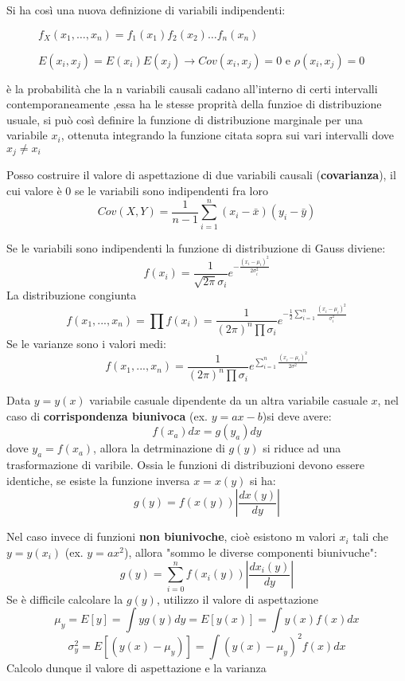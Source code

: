 \documentclass{article}
\begin{document}
Si ha così una nuova definizione di variabili indipendenti:
\begin{description}
    \item[] $f_X(x_1, \ldots, x_n) = f_1(x_1)f_2(x_2)\ldots f_n(x_n)$
    \item[] $E(x_i,x_j)=E(x_i)E(x_j) \rightarrow Cov(x_i,x_j)=0$ e $\rho(x_i,x_j)=0$
\end{description}

è la probabilità che la n variabili causali cadano all'interno  di certi intervalli contemporaneamente
,essa ha le stesse proprità della funzioe di distribuzione usuale, si può così definire la funzione di distribuzione marginale per una variabile $x_i$, ottenuta integrando
la funzione citata sopra sui vari intervalli dove $x_j\neq x_i$

Posso costruire il valore di aspettazione di due variabili causali (\textbf{covarianza}), il cui valore è 0 se le variabili sono indipendenti fra loro
\[
Cov (X, Y) = \frac{1}{n - 1} \sum_{i=1}^{n} (x_i - \bar{x})(y_i - \bar{y})
\]



Se le variabili sono indipendenti la funzione di distribuzione di Gauss diviene:
\[
f(x_i)=\frac{1}{\sqrt{2\pi}\sigma_i}e^{-\frac{(x_i-\mu_i)^2}{2\sigma_i^2}}
\]
La distribuzione congiunta
\[
f(x_1, ..., x_n)=\prod f(x_i) = \frac{1}{(2\pi)^n \prod \sigma_i} e^{-\frac{1}{2} \sum_{i=1}^{n} \frac{(x_i-\mu_i)^2}{\sigma_i^2}}
\]
Se le varianze sono i valori medi:
\[
f(x_1, ..., x_n)=\frac{1}{(2\pi)^n \prod \sigma_i} e^{ \sum_{i=1}^{n} \frac{(x_i-\mu_i)^2}{2\sigma^2}}
\]

Data $y=y(x)$ variabile casuale dipendente da un altra variabile casuale $x$, nel caso di \textbf{corrispondenza biunivoca} (ex. $y=ax -b$)si deve avere:
\[
f(x_a)dx=g(y_a)dy
\]
dove $y_a=f(x_a)$, allora la detrminazione di $g(y)$ si riduce ad una trasformazione di varibile. 
Ossia le funzioni di distribuzioni devono essere identiche, se esiste la funzione inversa $x=x(y)$ si ha: 
\[
g(y)=f(x(y))\left|\frac{dx(y)}{dy}\right|
\]

Nel caso invece di funzioni \textbf{non biunivoche}, cioè esistono m valori $x_i$ tali che $y=y(x_i)$ (ex. $y=ax^2$), allora "sommo le diverse componenti biunivuche":
\[
    g(y)=\sum_{i=0}^{n}f(x_i(y))\left|\frac{dx_i(y)}{dy}\right|
\]
Se è difficile calcolare la $g(y)$, utilizzo il valore di aspettazione
\[
\mu_y = E[y]=\int yg(y)dy= E[y(x)] =\int y(x)f(x)dx
\]
\[
\sigma_y^2=E[(y(x)-\mu_y)]= \int (y(x)-\mu_y)^2f(x)dx
\]
Calcolo dunque il valore di aspettazione e la varianza
\end{document}

